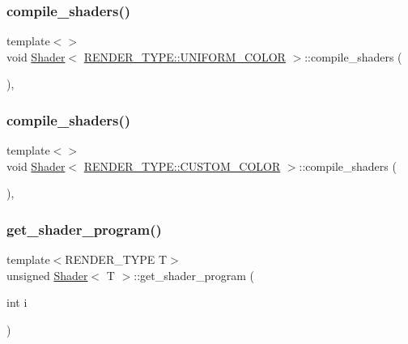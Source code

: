 \subsubsection{\texorpdfstring{compile\+\_\+shaders()}{compile\_shaders()}\hspace{0.1cm}{\footnotesize\ttfamily [2/3]}}
{\footnotesize\ttfamily template$<$$>$ \\
void \mbox{\hyperlink{classShader}{Shader}}$<$ \mbox{\hyperlink{render_8hpp_a24e288e18eb7b6e01de7565001fedb60aa98862073f71a928bad5099cc3e1c2ed}{R\+E\+N\+D\+E\+R\+\_\+\+T\+Y\+P\+E\+::\+U\+N\+I\+F\+O\+R\+M\+\_\+\+C\+O\+L\+OR}} $>$\+::compile\+\_\+shaders (\begin{DoxyParamCaption}{ }\end{DoxyParamCaption})\hspace{0.3cm}{\ttfamily [inline]}, {\ttfamily [protected]}}

\mbox{\label{classShader_ae486635d367b6054482c56747ed74846}} 
\subsubsection{\texorpdfstring{compile\+\_\+shaders()}{compile\_shaders()}\hspace{0.1cm}{\footnotesize\ttfamily [3/3]}}
{\footnotesize\ttfamily template$<$$>$ \\
void \mbox{\hyperlink{classShader}{Shader}}$<$ \mbox{\hyperlink{render_8hpp_a24e288e18eb7b6e01de7565001fedb60a9d34355b5a26c54b5dbab1e45245a6f4}{R\+E\+N\+D\+E\+R\+\_\+\+T\+Y\+P\+E\+::\+C\+U\+S\+T\+O\+M\+\_\+\+C\+O\+L\+OR}} $>$\+::compile\+\_\+shaders (\begin{DoxyParamCaption}{ }\end{DoxyParamCaption})\hspace{0.3cm}{\ttfamily [inline]}, {\ttfamily [protected]}}

\mbox{\label{classShader_a2c19b216850480109f9d5f7ed6ab6aa6}} 
\subsubsection{\texorpdfstring{get\+\_\+shader\+\_\+program()}{get\_shader\_program()}}
{\footnotesize\ttfamily template$<$R\+E\+N\+D\+E\+R\+\_\+\+T\+Y\+PE T$>$ \\
unsigned \mbox{\hyperlink{classShader}{Shader}}$<$ T $>$\+::get\+\_\+shader\+\_\+program (\begin{DoxyParamCaption}\item[{int}]{i }\end{DoxyParamCaption})\hspace{0.3cm}{\ttfamily [inline]}}

